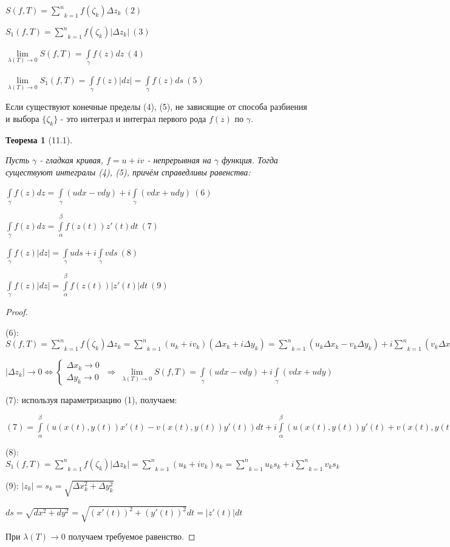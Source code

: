 \documentclass[draft]{report}
\newcommand{\forcenewline}{$\phantom{\mbox{newline}}$}
\newcommand{\then}{\ \Rightarrow\ }
\newcommand{\mint}[2]{\underset{#1}{\overset{#2}{\int}}}
\newcommand{\msum}[2]{\underset{#1}{\overset{#2}{\sum}}}
\newcommand{\mlim}[1]{\underset{#1}{\lim}}
\newcommand{\LRA}{\Leftrightarrow}
\renewcommand{\a}{\alpha}
\renewcommand{\b}{\beta}
\newcommand{\g}{\gamma}
\renewcommand{\l}{\lambda}
\newcommand{\D}{\Delta}
\newcommand{\sys}[1]{\left\{\begin{matrix}#1\end{matrix}\right.}
\newtheorem*{theor}{Теорема}
\theoremstyle{remark}
\begin{document}
$S(f,T)=\msum{k=1}{n}f(\zeta_k)\D z_k\ (2)$

$S_1(f,T)=\msum{k=1}{n}f(\zeta_k)|\D z_k|\ (3)$

$\mlim{\l(T)\to 0}S(f,T)=\mint{\g}{} f(z)dz\ (4)$

$\mlim{\l(T)\to 0}S_1(f,T)=\mint{\g}{} f(z)|dz|=\mint{\g}{} f(z)ds\ (5)$

Если существуют конечные пределы (4), (5), не зависящие от способа разбиения и выбора $\{\zeta_k\}$ - это интеграл и интеграл первого рода $f(z)$ по $\g$.

\begin{theor}[11.1]
\forcenewline

Пусть $\g$ - гладкая кривая, $f=u+iv$ - непрерывная на $\g$ функция. Тогда существуют интегралы (4), (5), причём справедливы равенства:

$\mint{\g}{}f(z)dz=\mint{\g}{}(udx-vdy)+i\mint{\g}{}(vdx+udy)\ (6)$

$\mint{\g}{}f(z)dz=\mint{\a}{\b}f(z(t))z'(t)dt\ (7)$

$\mint{\g}{}f(z)|dz|=\mint{\g}{}uds+i\mint{\g}{}vds\ (8)$

$\mint{\g}{}f(z)|dz|=\mint{\a}{\b}f(z(t))|z'(t)|dt\ (9)$
\end{theor}
\begin{proof}
\forcenewline

(6): $S(f,T)=\msum{k=1}{n}f(\zeta_k)\D z_k=\msum{k=1}{n}(u_k+iv_k)(\D x_k+i\D y_k)=\msum{k=1}{n}(u_k\D x_k-v_k\D y_k)+i\msum{k=1}{n}(v_k\D x_k+u_k\D y_k)$

$|\D z_k|\to 0 \LRA\sys{\D x_k\to 0 \\ \D y_k\to 0}\then \mlim{\l(T)\to 0}S(f,T)=\mint{\g}{}(udx-vdy)+i\mint{\g}{}(vdx+udy)$

(7): используя параметризацию (1), получаем:

$(7)=\mint\a\b(u(x(t),y(t))x'(t)-v(x(t),y(t))y'(t))dt+i\mint\a\b(u(x(t),y(t))y'(t)+v(x(t),y(t))x'(t))dt=\mint\a\b(u+iv)(x'+iy')=\mint\a\b f(z(t))z'(t)dt$

(8): $S_1(f,T)=\msum{k=1}{n}f(\zeta_k)|\D z_k|=\msum{k=1}{n}(u_k+iv_k)s_k=\msum{k=1}{n}u_ks_k+i\msum{k=1}{n}v_ks_k$

(9): $|z_k|=s_k=\sqrt{\D x_k^2+\D y_k^2}$

$ds=\sqrt{dx^2+dy^2}=\sqrt{(x'(t))^2+(y'(t))^2}dt=|z'(t)|dt$

При $\l(T)\to 0$ получаем требуемое равенство.
\end{proof}
\end{document}
